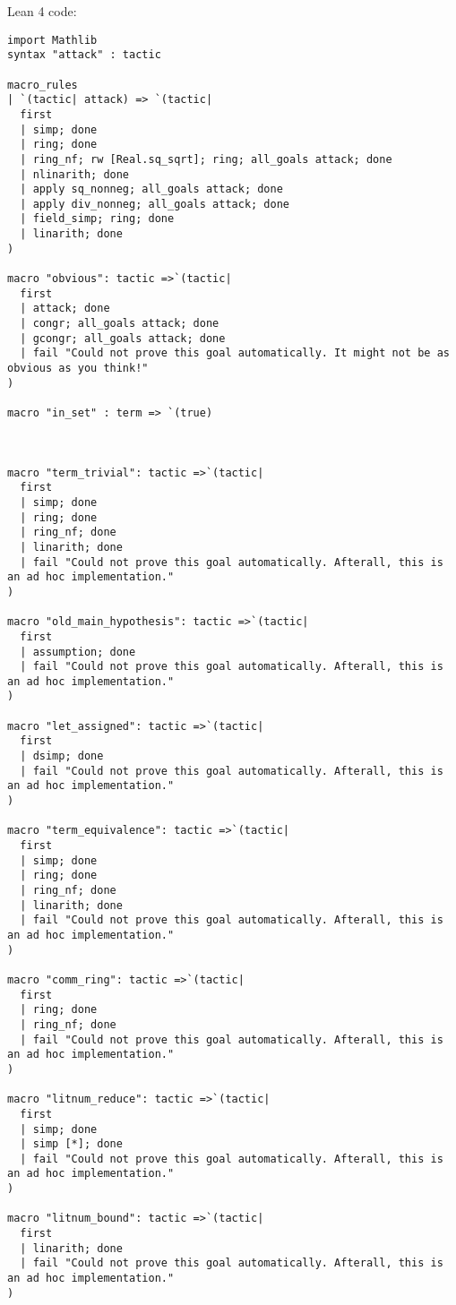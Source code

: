 \documentclass{article}
\begin{document}
Lean 4 code:
\begin{tcolorbox}[colback=white!10, width=\linewidth]
\begin{lstlisting}[language=Lean4]
import Mathlib
syntax "attack" : tactic

macro_rules
| `(tactic| attack) => `(tactic|
  first
  | simp; done
  | ring; done
  | ring_nf; rw [Real.sq_sqrt]; ring; all_goals attack; done
  | nlinarith; done
  | apply sq_nonneg; all_goals attack; done
  | apply div_nonneg; all_goals attack; done
  | field_simp; ring; done
  | linarith; done
)

macro "obvious": tactic =>`(tactic|
  first
  | attack; done
  | congr; all_goals attack; done
  | gcongr; all_goals attack; done
  | fail "Could not prove this goal automatically. It might not be as obvious as you think!"
)

macro "in_set" : term => `(true)



macro "term_trivial": tactic =>`(tactic|
  first
  | simp; done
  | ring; done
  | ring_nf; done
  | linarith; done
  | fail "Could not prove this goal automatically. Afterall, this is an ad hoc implementation."
)

macro "old_main_hypothesis": tactic =>`(tactic|
  first
  | assumption; done
  | fail "Could not prove this goal automatically. Afterall, this is an ad hoc implementation."
)

macro "let_assigned": tactic =>`(tactic|
  first
  | dsimp; done
  | fail "Could not prove this goal automatically. Afterall, this is an ad hoc implementation."
)

macro "term_equivalence": tactic =>`(tactic|
  first
  | simp; done
  | ring; done
  | ring_nf; done
  | linarith; done
  | fail "Could not prove this goal automatically. Afterall, this is an ad hoc implementation."
)

macro "comm_ring": tactic =>`(tactic|
  first
  | ring; done
  | ring_nf; done
  | fail "Could not prove this goal automatically. Afterall, this is an ad hoc implementation."
)

macro "litnum_reduce": tactic =>`(tactic|
  first
  | simp; done
  | simp [*]; done
  | fail "Could not prove this goal automatically. Afterall, this is an ad hoc implementation."
)

macro "litnum_bound": tactic =>`(tactic|
  first
  | linarith; done
  | fail "Could not prove this goal automatically. Afterall, this is an ad hoc implementation."
)


\end{lstlisting}
\end{tcolorbox}
\end{document}
